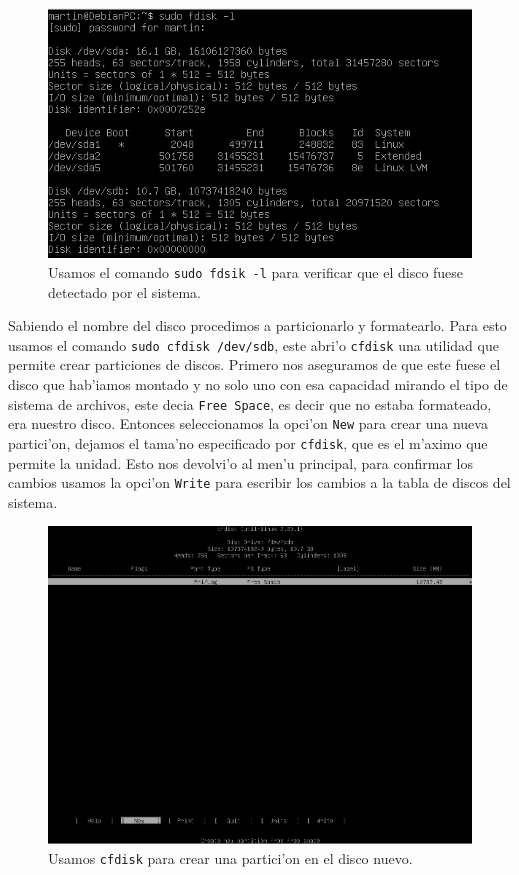 \documentclass[11pt]{article}
\begin{document}
		\begin{figure}[H]
    			\centering
    			\includegraphics[scale=0.55]{Images/rsync/rsync_disk_info.PNG}
    			\caption{Usamos el comando \texttt{sudo fdsik -l} para verificar que el disco fuese detectado por el sistema.}
    			\label{fig:rsync_disk_info}
		\end{figure}

		Sabiendo el nombre del disco procedimos a particionarlo y formatearlo. Para esto usamos el comando \texttt{sudo cfdisk /dev/sdb}, este abri'o \texttt{cfdisk} una utilidad que permite crear particiones de discos. Primero nos aseguramos de que este fuese el disco que hab'iamos montado y no solo uno con esa capacidad mirando el tipo de sistema de archivos, este decia \texttt{Free Space}, es decir que no estaba formateado, era nuestro disco. Entonces seleccionamos la opci'on \texttt{New} para crear una nueva partici'on, dejamos el tama'no especificado por \texttt{cfdisk}, que es el m'aximo que permite la unidad. Esto nos devolvi'o al men'u principal, para confirmar los cambios usamos la opci'on \texttt{Write} para escribir los cambios a la tabla de discos del sistema. 

		\begin{figure}[H]
    			\centering
    			\includegraphics[scale=0.40]{Images/rsync/rsync_disk_partition.PNG}
    			\caption{Usamos \texttt{cfdisk} para crear una partici'on en el disco nuevo.}
    			\label{fig:rsync_disk_partition}
		\end{figure}
\end{document}

